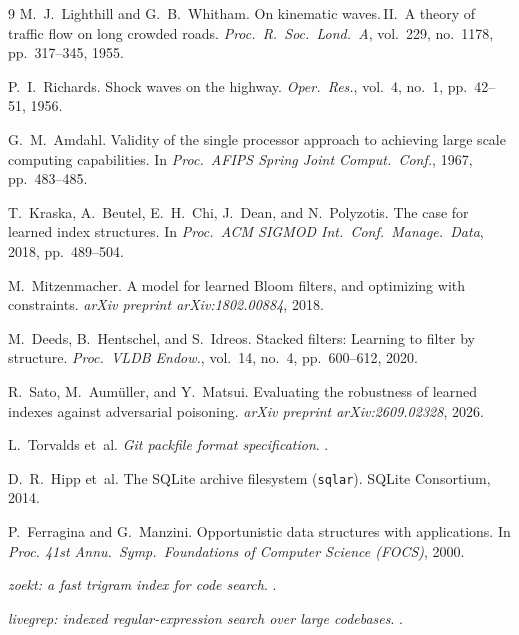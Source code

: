 \documentclass[11pt,letterpaper]{article}
\begin{document}
\begin{thebibliography}{9}
M.~J.~Lighthill and G.~B.~Whitham.
\newblock On kinematic waves.\,II.\ A theory of traffic flow on long crowded
  roads.
\newblock \emph{Proc.\ R.\ Soc.\ Lond.\ A}, vol.~229, no.~1178,
  pp.~317--345, 1955.

P.~I.~Richards.
\newblock Shock waves on the highway.
\newblock \emph{Oper.\ Res.}, vol.~4, no.~1, pp.~42--51, 1956.

G.~M.~Amdahl.
\newblock Validity of the single processor approach to achieving large scale
  computing capabilities.
\newblock In \emph{Proc.\ AFIPS Spring Joint Comput.\ Conf.}, 1967,
  pp.~483--485.

T.~Kraska, A.~Beutel, E.~H.~Chi, J.~Dean, and N.~Polyzotis.
\newblock The case for learned index structures.
\newblock In \emph{Proc.\ ACM SIGMOD Int.\ Conf.\ Manage.\ Data}, 2018,
  pp.~489--504.

M.~Mitzenmacher.
\newblock A model for learned Bloom filters, and optimizing with constraints.
\newblock \emph{arXiv preprint arXiv:1802.00884}, 2018.

M.~Deeds, B.~Hentschel, and S.~Idreos.
\newblock Stacked filters: Learning to filter by structure.
\newblock \emph{Proc.\ VLDB Endow.}, vol.~14, no.~4, pp.~600--612, 2020.

R.~Sato, M.~Aum{\"u}ller, and Y.~Matsui.
\newblock Evaluating the robustness of learned indexes against adversarial
  poisoning.
\newblock \emph{arXiv preprint arXiv:2609.02328}, 2026.

L.~Torvalds et~al.
\newblock \emph{Git packfile format specification}.
\newblock {}.

D.~R.~Hipp et~al.
\newblock The SQLite archive filesystem (\texttt{sqlar}).
\newblock SQLite Consortium, 2014.

P.~Ferragina and G.~Manzini.
\newblock Opportunistic data structures with applications.
\newblock In \emph{Proc. 41st Annu.\ Symp.\ Foundations of Computer Science
  (FOCS)}, 2000.

\newblock \emph{zoekt: a fast trigram index for code search}.
\newblock {}.

\newblock \emph{livegrep: indexed regular-expression search over large
  codebases}.
\newblock {}.


\end{thebibliography}
\end{document}
